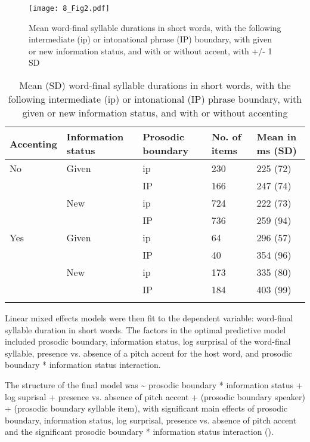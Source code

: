 \documentclass[output=paper,colorlinks,citecolor=brown]{langscibook}
\begin{document}
\begin{figure}
\texttt{[image: 8\_Fig2.pdf]}
\caption{Mean word-final syllable durations in short words, with the following intermediate (ip) or intonational phrase (IP) boundary, with given or new information status, and with or without accent, with +/- 1 SD}
\label{fig2}
\end{figure}

\begin{table}
\begin{tabularx}{0.8\textwidth}{QQQQQ}
\lsptoprule
{A}ccenting & {I}nformation status & {P}rosodic boundary & {N}o. of items & {M}ean in ms ({SD})\\ \hline
 No & Given & ip & 230 & 225 (72)\\
  &  & IP & 166 & 247 (74)\\
  & New & ip & 724 & 222 (73)\\
  & & IP & 736 & 259 (94)\\
 Yes & Given & ip & 64 & 296 (57)\\
  & & IP & 40 & 354 (96)\\
  & New & ip & 173 & 335 (80)\\
  & & IP & 184 & 403 (99)\\
\lspbottomrule
\end{tabularx}
\caption{Mean (SD) word-final syllable durations in short words, with the following intermediate (ip) or intonational (IP) phrase boundary, with given or new information status, and with or without accenting}
\label{table:2}
\end{table}

Linear mixed effects models were then fit to the dependent variable: word-final syllable duration in short words. The factors in the optimal predictive model included prosodic boundary, information status, log surprisal of the word-final syllable, presence vs. absence of a pitch accent for the host word, and prosodic boundary * information status interaction. 

The structure of the final model was {\textasciitilde} prosodic boundary * information status + log suprisal + presence vs. absence of pitch accent + (prosodic boundary {\textbar} speaker) + (prosodic boundary {\textbar} syllable item), with significant main effects of prosodic boundary, information status, log surprisal, presence vs. absence of pitch accent and the significant prosodic boundary * information status interaction ().
\end{document}
